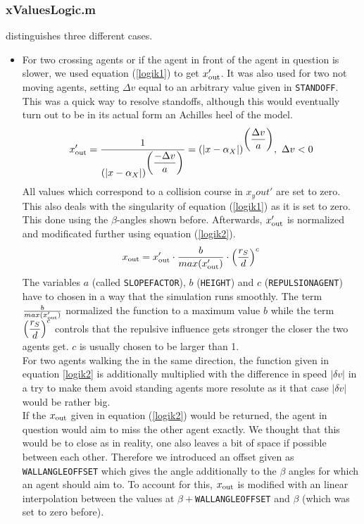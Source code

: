 \subsubsection{xValuesLogic.m}
 distinguishes three different cases.
\begin{itemize}
	\item For two crossing agents or if the agent in front of the agent in question is slower, we used equation (\ref{logik1}) to get $x_{\text{out}}'$. It was also used for two not moving agents, setting $\Delta v$ equal to an arbitrary value given in \texttt{STANDOFF}. This was a quick way to resolve standoffs, although this would eventually turn out to be in its actual form an Achilles heel of the model.
	\begin{equation}\label{logik1}
		x_{\text{out}}' = \frac{1}{\displaystyle (|x - \alpha_X|)^{\displaystyle \left(\frac{-\Delta v}{a}\right)}} = (|x - \alpha_X|)^{\displaystyle \left(\frac{\Delta v}{a}\right)},\ \Delta v < 0
	\end{equation}
	\noi All values which correspond to a collision course in $x_y{out}'$ are set to zero. This also deals with the singularity of equation (\ref{logik1}) as it is set to zero. This done using the $\beta$-angles shown before. Afterwards, $x_{\text{out}}'$ is normalized and modificated further using equation (\ref{logik2}).
	\begin{equation}\label{logik2}
		x_{\text{out}} = x_{\text{out}}' \cdot \frac{b}{max(x_{\text{out}}')} \cdot \displaystyle \left(\frac{r_S}{d}\right)^c
	\end{equation}
	\noi The variables $a$ (called \texttt{SLOPEFACTOR}), $b$ (\texttt{HEIGHT}) and $c$ (\texttt{REPULSIONAGENT}) have to chosen in a way that the simulation runs smoothly. The term $\frac{b}{max(x_{\text{out}}')}$ normalized the function to a maximum value $b$ while the term $\displaystyle \left(\frac{r_S}{d}\right)^c$ controls that the repulsive influence gets stronger the closer the two agents get. $c$ is usually chosen to be larger than 1.\\
	For two agents walking the in the same direction, the function given in equation \ref{logik2} is additionally multiplied with the difference in speed $|\delta v|$ in a try to make them avoid standing agents more resolute as it that case $|\delta v|$ would be rather big.\\
	
	\noi If the $x_{\text{out}}$ given in equation (\ref{logik2}) would be returned, the agent in question would aim to miss the other agent exactly. We thought that this would be to close as in reality, one also leaves a bit of space if possible between each other. Therefore we introduced an offset given as \texttt{WALLANGLEOFFSET} which gives the angle additionally to the $\beta$ angles for which an agent should aim to. To account for this, $x_{\text{out}}$ is modified with an linear interpolation between the values at $\beta + $\texttt{WALLANGLEOFFSET} and $\beta$ (which was set to zero before).


\end{itemize}
